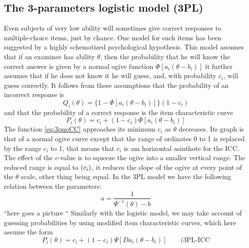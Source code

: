 \subsection{The 3-parameters logistic model (3PL)}
Even subjects of very low ability will sometimes give correct responses to multiple-choice items, just by chance. One model for such items has been suggested by a highly schematized psychological hypothesis. This model assumes that if an examinee has ability $\theta$, then the probability that he will know the correct answer is given by a normal ogive function $\Phi[a_i(\theta-b_i)]$ it further assumes that if he does not know it he will guess, and, with probability $c_i$, will guess correctly. It follows from these assumptions that the probability of an incorrect response is
\begin{equation}
Q_i(\theta)=\{ 1- \Phi[a_i(\theta-b_i)] \} (1-c_i)
\end{equation}
and that the probability of a correct response is the item characteristic curve
\begin{equation}\label{eq:3pnoICC}
P_i(\theta)=c_i +(1-c_i)\Phi[a_i(\theta-b_i)]
\end{equation}
The function \ref{eq:3pnoCC} approaches its minimum $c_i$ as $\theta$ decreases. Its graph
is that of a normal ogive curve except that the range of ordinates 0 to 1 is replaced by the range $c_i$ to 1, that means that $c_i$ is am horizontal asinthote for the ICC.
The effect of the $c$-value is to squeeze the ogive into a smaller vertical range. The reduced range is equal to $(\-c_i)$, it reduces the slope of the ogive at every point of the $\theta$ scale, other thing being equal. In the 3PL model we have the following relation between the parameters:%
\begin{equation}
a=\frac{1}{\Psi^{-1}(\theta)-b}
\end{equation}
``here goes a picture ``
Similarly with the logistic model, we may take account of guessing probabilities by using modified item characteristic curves, which here assume the form
\begin{equation} \label{eq:3plICC}
P_i(\theta)=c_i +(1-c_i)\Psi[Da_i(\theta-b_i)] \qquad \text{(3PL-ICC}
\end{equation}

